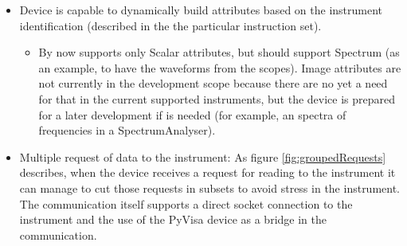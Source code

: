 \documentclass[a4paper,10pt]{article}
\begin{document}
\begin{itemize}
    \item Device is capable to dynamically build attributes based on the instrument identification (described in the the particular instruction set).
    \begin{itemize}
        \item By now supports only Scalar attributes, but should support Spectrum (as an example, to have the waveforms from the scopes). Image attributes are not currently in the development scope because there are no yet a need for that in the current supported instruments, but the device is prepared for a later development if is needed (for example, an spectra of frequencies in a SpectrumAnalyser).
    \end{itemize}
    \item Multiple request of data to the instrument: As figure \ref{fig:groupedRequests} describes, when the device receives a request for reading to the instrument it can manage to cut those requests in subsets to avoid stress in the instrument. The communication itself supports a direct socket connection to the instrument and the use of the PyVisa device as a bridge in the communication.
\end{itemize}

\begin{figure}[h]
\end{figure}
\end{document}
